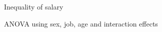 \documentclass[12pt]{beamer}
\begin{document}
\begin{frame}{\textcolor{bscuro}{Inequality of salary}}	
	\begin{figure}[!ht] 
		\centering
	\end{figure}
\end{frame}


\begin{frame}{\textcolor{bscuro}{ANOVA using sex, job, age and interaction effects}}
	\begin{figure}[!ht] 
		\centering
	\end{figure}
\end{frame} 
\end{document}
